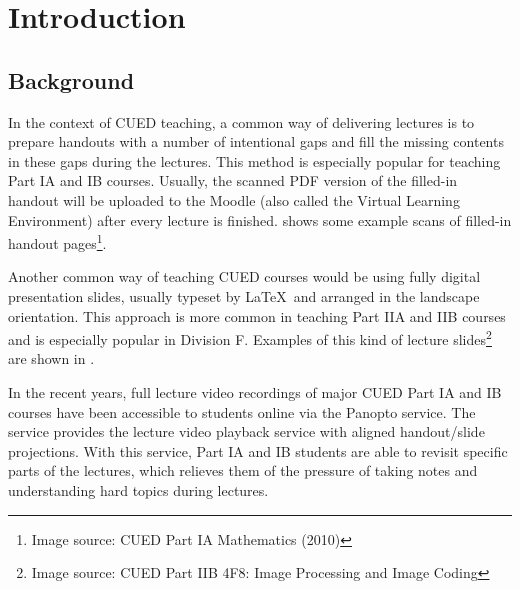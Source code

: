 
\chapter{Introduction}

\ifpdf
    \graphicspath{{Chapter1/Figs/Raster/}{Chapter1/Figs/PDF/}{Chapter1/Figs/}}
\else
    \graphicspath{{Chapter1/Figs/Vector/}{Chapter1/Figs/}}
\fi


\section{Background}
\label{sec:intro-background}

In the context of CUED teaching, a common way of delivering lectures is to prepare handouts with a number of intentional gaps and fill the missing contents in these gaps during the lectures. This method is especially popular for teaching Part IA and IB courses. Usually, the scanned PDF version of the filled-in handout will be uploaded to the Moodle (also called the Virtual Learning Environment) after every lecture is finished.  shows some example scans of filled-in handout pages\footnote{Image source: CUED Part IA Mathematics (2010)}.

Another common way of teaching CUED courses would be using fully digital presentation slides, usually typeset by \LaTeX ~and arranged in the landscape orientation. This approach is more common in teaching Part IIA and IIB courses and is especially popular in Division F. Examples of this kind of lecture slides\footnote{Image source: CUED Part IIB 4F8: Image Processing and Image Coding} are shown in .

In the recent years, full lecture video recordings of major CUED Part IA and IB courses have been accessible to students online via the Panopto service. The service provides the lecture video playback service with aligned handout/slide projections. With this service, Part IA and IB students are able to revisit specific parts of the lectures, which relieves them of the pressure of taking notes and understanding hard topics during lectures.

